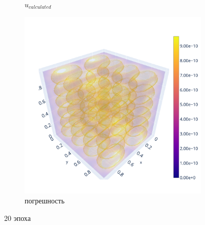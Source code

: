 \documentclass[a4paper,hidelinks,12pt]{article}
\begin{document}
\begin{figure}[H]
\begin{subfigure}{.33\textwidth}
  \caption{$u_{calculated}$}
\end{subfigure}%
\begin{subfigure}{.33\textwidth}
  \centering
  \includegraphics[width=\linewidth]{pictures/19_L1_128_diff.png}
  \caption{погрешность}
\end{subfigure}%
\caption{20 эпоха}
\label{fig:fig}
\end{figure}
\end{document}
